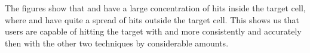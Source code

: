 The figures show that \swipe and \throw have a large concentration of hits inside the target cell, where \pinch and \tilt have quite a spread of hits outside the target cell. 
This shows us that users are capable of hitting the target with \swipe and \throw more consistently and accurately then with the other two techniques by considerable amounts.


\begin{figure}[H]
	\centering
	 \\ 

\end{figure}
